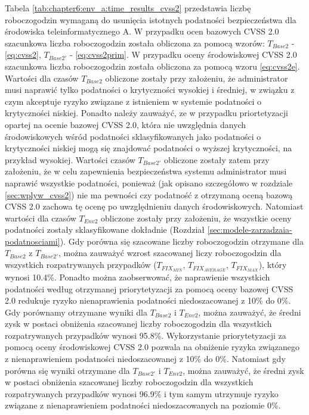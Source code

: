 \bigbreak
Tabela \ref{tab:chapter6:env_a:time_results_cvss2} przedstawia liczbę roboczogodzin wymaganą do usunięcia istotnych podatności bezpieczeństwa dla środowiska teleinformatycznego A. W przypadku ocen bazowych CVSS 2.0 szacunkowa liczba roboczogodzin została obliczona za pomocą wzorów: $T_{Base2}$ - \ref{eq:cvss2}, $T_{Base2'}$ - \ref{eq:cvss2prim}. W przypadku oceny środowiskowej CVSS 2.0 szacunkowa liczba roboczogodzin została obliczona za pomocą wzoru \ref{eq:cvss2e}. Wartości dla czasów $T_{Base2}$ obliczone zostały przy założeniu, że administrator musi naprawić tylko podatności o krytyczności wysokiej i średniej, w związku z czym akceptuje ryzyko związane z istnieniem w systemie podatności o krytyczności niskiej. Ponadto należy zauważyć, ze w przypadku priortetyzacji opartej na ocenie bazowej CVSS 2.0, która nie uwzględnia danych środowiskowych wśród podatności sklasyfikowanych jako podatności o krytyczności niskiej mogą się znajdować podatności o wyższej krytyczności, na przykład wysokiej. Wartości czasów $T_{Base2'}$ obliczone zostały zatem przy założeniu, że w celu zapewnienia bezpieczeństwa systemu administrator musi naprawić wszystkie podatności, ponieważ (jak opisano szczegółowo w rozdziale \ref{sec:wplyw_cvss2}) nie ma pewności czy podatność z otrzymaną oceną bazową CVSS 2.0 zachowa tę ocenę po uwzględnieniu danych środowiskowych. Natomiast wartości dla czasów $T_{Env2}$ obliczone zostały przy założeniu, że wszystkie oceny podatności zostały sklasyfikowane dokładnie (Rozdział \ref{sec:modele-zarzadzaia-podatnosciami}). Gdy porówna się szacowane liczby roboczogodzin otrzymane dla $T_{Base2}$ z $T_{Base2'}$, można zauważyć wzrost szacowanej liczy roboczogodzin dla wszystkich rozpatrywanych przypadków ($T_{FIX_{MIN}}$, $T_{FIX_{AVERAGE}}$, $T_{FIX_{MAX}}$), który wynosi 10.4\%. Ponadto można zaobserwować, że naprawienie wszystkich podatności według otrzymanej priorytetyzacji za pomocą oceny bazowej CVSS 2.0 redukuje ryzyko nienaprawienia podatności niedoszacowanej z 10\% do 0\%. Gdy porównamy otrzymane wyniki dla $T_{Base2}$ i $T_{Env2}$, można zauważyć, że średni zysk w postaci obniżenia szacowanej liczby roboczogodzin dla wszystkich rozpatrywanych przypadków wynosi 95.8\%. Wykorzystanie priorytetyzacji za pomocą oceny środowiskowej CVSS 2.0 pozwala na obniżenie ryzyka związanego z nienaprawieniem podatności niedoszacowanej z 10\% do 0\%. Natomiast gdy porówna się wyniki otrzymane dla $T_{Base2'}$ i $T_{Env2}$, można zauważyć, że średni zysk w postaci obniżenia szacowanej liczby roboczogodzin dla wszystkich rozpatrywanych przypadków wynosi 96.9\% i tym samym utrzymuje ryzyko związane z nienaprawieniem podatności niedoszacowanych na poziomie 0\%.

